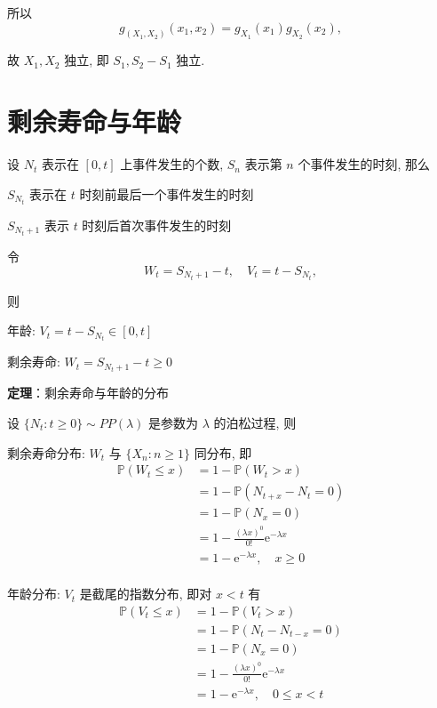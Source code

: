 \documentclass[openany]{ctexbook}
\theoremstyle{kaiti}
\theoremstyle{normal}
\begin{document}
  所以
\begin{equation}
    g_{(X_1,X_2)}(x_1,x_2)=g_{X_1}(x_1)g_{X_2}(x_2),
\end{equation}
  
  故 $X_1,X_2$ 独立, 即 $S_1,S_2-S_1$ 独立.
  
\section{剩余寿命与年龄}
  
  设 $N_t$ 表示在 $[0,t]$ 上事件发生的个数, $S_n$ 表示第 $n$ 个事件发生的时刻, 那么

 $S_{N_t}$ 表示在 $t$ 时刻前最后一个事件发生的时刻

 $S_{N_t+1}$ 表示 $t$ 时刻后首次事件发生的时刻
  
  令
\begin{equation}
    W_t=S_{N_t+1}-t,\quad V_t=t-S_{N_t},
\end{equation}
  
  则

年龄: $V_t=t-S_{N_t}\in[0,t]$

剩余寿命: $W_t=S_{N_t+1}-t\geqslant0$
  
\textbf{定理}：剩余寿命与年龄的分布
  
设 $\{N_t:t\geqslant0\}\sim PP(\lambda)$ 是参数为 $\lambda$ 的泊松过程, 则

剩余寿命分布: $W_t$ 与 $\{X_n:n\geqslant1\}$ 同分布, 即
\begin{equation}
    \begin{aligned}
      \mathbb{P}(W_t\leqslant x)
      &=1-\mathbb{P}(W_t>x)\\
      &=1-\mathbb{P}(N_{t+x}-N_t=0)\\
      &=1-\mathbb{P}(N_x=0)\\
      &=1-\frac{(\lambda x)^0}{0!}\mathrm{e}^{-\lambda x}\\
      &=1-\mathrm{e}^{-\lambda x},\quad x\geqslant0\\
    \end{aligned}
\end{equation}
  

年龄分布: $V_t$ 是截尾的指数分布, 即对 $x < t$ 有
\begin{equation}
    \begin{aligned}
      \mathbb{P}(V_t\leqslant x)
      &=1-\mathbb{P}(V_t>x)\\
      &=1-\mathbb{P}(N_t-N_{t-x}=0)\\
      &=1-\mathbb{P}(N_x=0)\\
      &=1-\frac{(\lambda x)^0}{0!}\mathrm{e}^{-\lambda x}\\
      &=1-\mathrm{e}^{-\lambda x}, \quad 0 \leqslant x < t\\
    \end{aligned}  
\end{equation}
  
\end{document}
